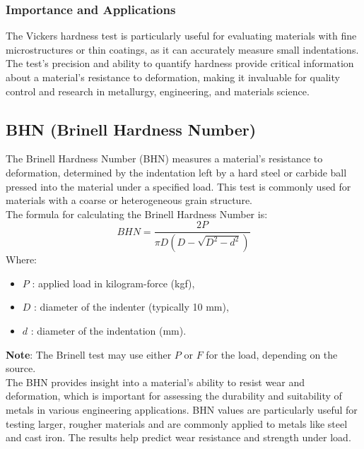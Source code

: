 \documentclass{article}
\begin{document}
\subsubsection*{Importance and Applications}  

The Vickers hardness test is particularly useful for evaluating materials with fine microstructures or thin coatings, as it can accurately measure small indentations. The test’s precision and ability to quantify hardness provide critical information about a material’s resistance to deformation, making it invaluable for quality control and research in metallurgy, engineering, and materials science.  

\newpage
\subsection{BHN (Brinell Hardness Number)}
The Brinell Hardness Number (BHN) measures a material's resistance to deformation, determined by the indentation left by a hard steel or carbide ball pressed into the material under a specified load. This test is commonly used for materials with a coarse or heterogeneous grain structure.\\[1em]
The formula for calculating the Brinell Hardness Number is:
\begin{equation}
    BHN = \frac{2P}{\pi D (D - \sqrt{D^2 - d^2})}
\end{equation}
Where:
\begin{itemize}[itemsep=-1mm]
    \item \( P \) : applied load in kilogram-force (kgf),
    \item \( D \) : diameter of the indenter (typically 10 mm),
    \item \( d \) : diameter of the indentation (mm).
\end{itemize}
\textbf{Note}: The Brinell test may use either $P$ or $F$ for the load, depending on the source.\\ 
The BHN provides insight into a material's ability to resist wear and deformation, which is important for assessing the durability and suitability of metals in various engineering applications. BHN values are particularly useful for testing larger, rougher materials and are commonly applied to metals like steel and cast iron. The results help predict wear resistance and strength under load.
\end{document}
